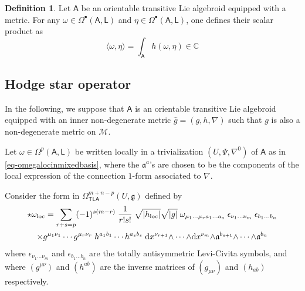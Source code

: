 \documentclass[number]{elsarticle}
\theoremstyle{definition}
\newtheorem{definition}[theorem]{Definition}
\theoremstyle{remark}
\numberwithin{equation}{section}
\begin{document}
\begin{definition}
\label{def-scalarproductforms}
Let ${{{{\mathbf{\mathsf{{A}}}}}}}$ be an orientable transitive Lie algebroid equipped with a metric. For any $\omega \in \Omega^{\bullet}({{{{\mathbf{\mathsf{{A}}}}}}}, {{{{\mathbf{\mathsf{{L}}}}}}})$ and $\eta \in \Omega^{\bullet}({{{{\mathbf{\mathsf{{A}}}}}}}, {{{{\mathbf{\mathsf{{L}}}}}}})$, one defines their scalar product as
\begin{equation*}
\langle \omega, \eta \rangle = \int_{{{{\mathbf{\mathsf{{A}}}}}}} h(\omega, \eta) \in {{\mathbb C}}
\end{equation*}
\end{definition}

\subsection{Hodge star operator}
\label{subsec-hodgeoperators}

In the following, we suppose that ${{{{\mathbf{\mathsf{{A}}}}}}}$ is an orientable transitive Lie algebroid equipped with an inner non-degenerate metric ${{\widehat{g}}} = (g,h,\nabla)$ such that $g$ is also a non-degenerate metric on ${{{{\mathcal{{M}}}}}}$.

Let $\omega \in \Omega^p({{{{\mathbf{\mathsf{{A}}}}}}}, {{{{\mathbf{\mathsf{{L}}}}}}})$ be written locally in a trivialization $(U, \Psi, \nabla^{0})$ of ${{{{\mathbf{\mathsf{{A}}}}}}}$ as in \eqref{eq-omegalocinmixedbasis}, where the ${\mathfrak{a}}^{a}$'s are chosen to be the components of the local expression of the connection $1$-form associated to $\nabla$.

Consider the form in $\Omega^{m+n-p}_{{{{\mathbf{\mathsf{{TLA}}}}}}}(U,{{\mathfrak g}})$ defined by
\begin{multline}
\label{eq-hodgestarlocal}
{\mathop{\star}} \omega_{{\text{\textup{loc}}}} = \sum_{r+s=p} (-1)^{s(m-r)}\; \frac{1}{r! s!}\; \sqrt{|h_{{\text{\textup{loc}}}}|} \sqrt{|g|}\; \omega_{\mu_1 \ldots \mu_r a_1 \ldots a_s}\; \epsilon_{\nu_1 \ldots \nu_m}\; \epsilon_{b_1 \ldots b_n} \\
\times g^{\mu_1 \nu_1} \cdots g^{\mu_r \nu_r}\; h^{a_1 b_1} \cdots h^{a_s b_s}\; {\text{\textup{d}}} x^{\nu_{r+1}} {\mathord{\wedge}} \cdots {\mathord{\wedge}} {\text{\textup{d}}} x^{\nu_m} {\mathord{\wedge}} {\mathfrak{a}}^{b_{s+1}} {\mathord{\wedge}} \cdots {\mathord{\wedge}} {\mathfrak{a}}^{b_n}
\end{multline}
where $\epsilon_{\nu_1 \ldots \nu_m}$ and $\epsilon_{b_1 \ldots b_n}$ are the totally antisymmetric Levi-Civita symbols, and where $(g^{\mu \nu})$ and $(h^{a b})$ are the inverse matrices of $(g_{\mu \nu})$ and $(h_{a b})$ respectively.
\end{document}
